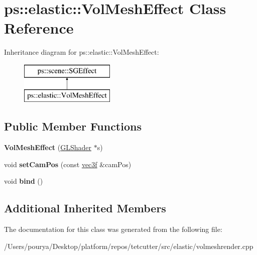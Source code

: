 \hypertarget{classps_1_1elastic_1_1VolMeshEffect}{}\section{ps\+:\+:elastic\+:\+:Vol\+Mesh\+Effect Class Reference}
\label{classps_1_1elastic_1_1VolMeshEffect}
Inheritance diagram for ps\+:\+:elastic\+:\+:Vol\+Mesh\+Effect\+:\begin{figure}[H]
\begin{center}
\leavevmode
\includegraphics[height=2.000000cm]{classps_1_1elastic_1_1VolMeshEffect}
\end{center}
\end{figure}
\subsection*{Public Member Functions}
\begin{DoxyCompactItemize}
\item 
\hypertarget{classps_1_1elastic_1_1VolMeshEffect_a5da356c1f7bc055978c505098cc9bf47}{}{\bfseries Vol\+Mesh\+Effect} (\hyperlink{classps_1_1opengl_1_1GLShader}{G\+L\+Shader} $\ast$s)\label{classps_1_1elastic_1_1VolMeshEffect_a5da356c1f7bc055978c505098cc9bf47}

\item 
\hypertarget{classps_1_1elastic_1_1VolMeshEffect_aa4590c1fec05b90cb664bd85513e42af}{}void {\bfseries set\+Cam\+Pos} (const \hyperlink{classps_1_1base_1_1Vec3}{vec3f} \&cam\+Pos)\label{classps_1_1elastic_1_1VolMeshEffect_aa4590c1fec05b90cb664bd85513e42af}

\item 
\hypertarget{classps_1_1elastic_1_1VolMeshEffect_a5f7ff629a210128eba78ee0923a5d283}{}void {\bfseries bind} ()\label{classps_1_1elastic_1_1VolMeshEffect_a5f7ff629a210128eba78ee0923a5d283}

\end{DoxyCompactItemize}
\subsection*{Additional Inherited Members}


The documentation for this class was generated from the following file\+:\begin{DoxyCompactItemize}
\item 
/\+Users/pourya/\+Desktop/platform/repos/tetcutter/src/elastic/volmeshrender.\+cpp\end{DoxyCompactItemize}
